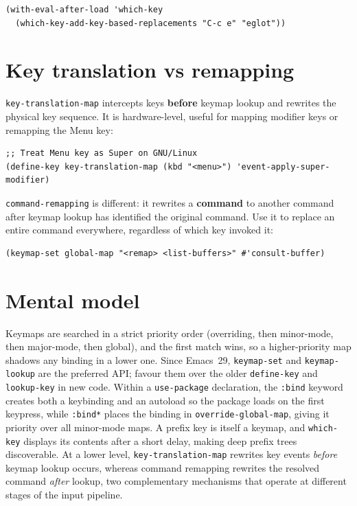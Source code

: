 \begin{verbatim}
(with-eval-after-load 'which-key
  (which-key-add-key-based-replacements "C-c e" "eglot"))
\end{verbatim}

\section{Key translation vs remapping}\label{key-translation-vs-remapping}

\texttt{key-translation-map} intercepts keys \textbf{before} keymap lookup and rewrites the physical key sequence. It is hardware-level, useful for mapping modifier keys or remapping the Menu key:

\begin{verbatim}
;; Treat Menu key as Super on GNU/Linux
(define-key key-translation-map (kbd "<menu>") 'event-apply-super-modifier)
\end{verbatim}

\texttt{command-remapping} is different: it rewrites a \textbf{command} to another command after keymap lookup has identified the original command. Use it to replace an entire command everywhere, regardless of which key invoked it:

\begin{verbatim}
(keymap-set global-map "<remap> <list-buffers>" #'consult-buffer)
\end{verbatim}

\section{Mental model}
Keymaps are searched in a strict priority order (overriding, then
minor-mode, then major-mode, then global), and the first match wins, so
a higher-priority map shadows any binding in a lower one.  Since
Emacs~29, \texttt{keymap-set} and \texttt{keymap-lookup} are the
preferred API; favour them over the older \texttt{define-key} and
\texttt{lookup-key} in new code.  Within a \texttt{use-package}
declaration, the \texttt{:bind} keyword creates both a keybinding and an
autoload so the package loads on the first keypress, while
\texttt{:bind*} places the binding in \texttt{override-global-map},
giving it priority over all minor-mode maps.  A prefix key is itself a
keymap, and \texttt{which-key} displays its contents after a short
delay, making deep prefix trees discoverable.  At a lower level,
\texttt{key-translation-map} rewrites key events \emph{before} keymap
lookup occurs, whereas command remapping rewrites the resolved command
\emph{after} lookup, two complementary mechanisms that operate at
different stages of the input pipeline.
